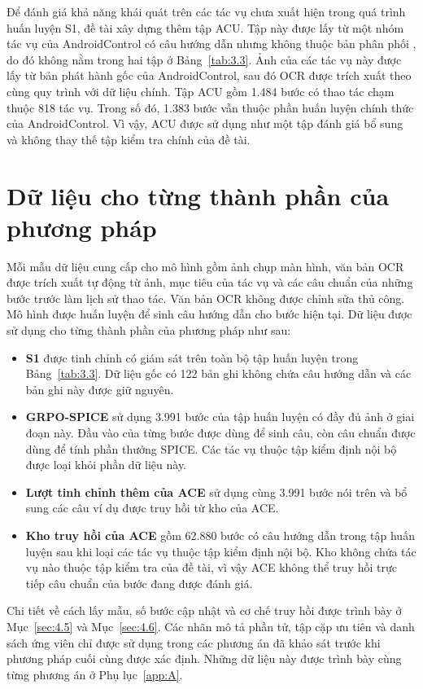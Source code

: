 Để đánh giá khả năng khái quát trên các tác vụ chưa xuất hiện trong quá trình huấn luyện S1, đề tài xây dựng thêm tập ACU. Tập này được lấy từ một nhóm tác vụ của AndroidControl có câu hướng dẫn nhưng không thuộc bản phân phối , do đó không nằm trong hai tập ở Bảng~\ref{tab:3.3}. Ảnh của các tác vụ này được lấy từ bản phát hành gốc của AndroidControl, sau đó OCR được trích xuất theo cùng quy trình với dữ liệu chính. Tập ACU gồm 1.484 bước có thao tác chạm thuộc 818 tác vụ. Trong số đó, 1.383 bước vẫn thuộc phần huấn luyện chính thức của AndroidControl. Vì vậy, ACU được sử dụng như một tập đánh giá bổ sung và không thay thế tập kiểm tra chính của đề tài.

\section{Dữ liệu cho từng thành phần của phương pháp}\label{sec:3.5}\label{sec:3.4}

Mỗi mẫu dữ liệu cung cấp cho mô hình gồm ảnh chụp màn hình, văn bản OCR được trích xuất tự động từ ảnh, mục tiêu của tác vụ và các câu chuẩn của những bước trước làm lịch sử thao tác. Văn bản OCR không được chỉnh sửa thủ công. Mô hình được huấn luyện để sinh câu hướng dẫn cho bước hiện tại. Dữ liệu được sử dụng cho từng thành phần của phương pháp như sau:

\begin{itemize}
\item \textbf{S1} được tinh chỉnh có giám sát trên toàn bộ tập huấn luyện trong Bảng~\ref{tab:3.3}. Dữ liệu gốc có 122 bản ghi không chứa câu hướng dẫn và các bản ghi này được giữ nguyên.
\item \textbf{GRPO-SPICE} sử dụng 3.991 bước của tập huấn luyện có đầy đủ ảnh ở giai đoạn này. Đầu vào của từng bước được dùng để sinh câu, còn câu chuẩn được dùng để tính phần thưởng SPICE. Các tác vụ thuộc tập kiểm định nội bộ được loại khỏi phần dữ liệu này.
\item \textbf{Lượt tinh chỉnh thêm của ACE} sử dụng cùng 3.991 bước nói trên và bổ sung các câu ví dụ được truy hồi từ kho của ACE.
\item \textbf{Kho truy hồi của ACE} gồm 62.880 bước có câu hướng dẫn trong tập huấn luyện sau khi loại các tác vụ thuộc tập kiểm định nội bộ. Kho không chứa tác vụ nào thuộc tập kiểm tra của đề tài, vì vậy ACE không thể truy hồi trực tiếp câu chuẩn của bước đang được đánh giá.
\end{itemize}

Chi tiết về cách lấy mẫu, số bước cập nhật và cơ chế truy hồi được trình bày ở Mục~\ref{sec:4.5} và Mục~\ref{sec:4.6}. Các nhãn mô tả phần tử, tập cặp ưu tiên và danh sách ứng viên chỉ được sử dụng trong các phương án đã khảo sát trước khi phương pháp cuối cùng được xác định. Những dữ liệu này được trình bày cùng từng phương án ở Phụ lục~\ref{app:A}.

